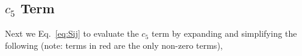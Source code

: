 \subsection{$c_{5}$ Term}
Next we Eq.~\ref{eq:Sij} to evaluate the $c_{5}$ term by expanding and
simplifying the following (note: terms in red are the only non-zero terms), 
